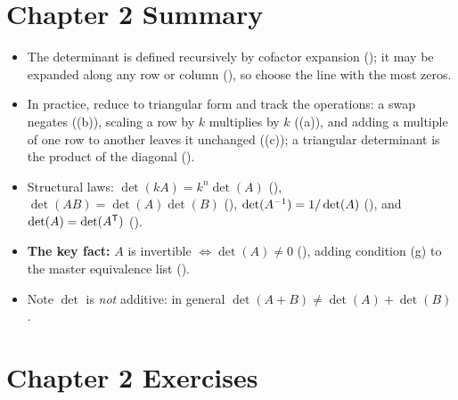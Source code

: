 \section*{Chapter 2 Summary}
\begin{itemize}[leftmargin=1.4em,itemsep=2pt]
\item The determinant is defined recursively by cofactor expansion (); it may be expanded along any row or column (), so choose the line with the most zeros.
\item In practice, reduce to triangular form and track the operations: a swap negates ((b)), scaling a row by $k$ multiplies by $k$ ((a)), and adding a multiple of one row to another leaves it unchanged ((c)); a triangular determinant is the product of the diagonal ().
\item Structural laws: $\det(kA)=k^n\det(A)$ (), $\det(AB)=\det(A)\det(B)$ (), $\det(A^{-1})=1/\det(A)$ (), and $\det(A)=\det(A^{\mathsf{T}})$ ().
\item \textbf{The key fact:} $A$ is invertible $\iff\det(A)\neq0$ (), adding condition (g) to the master equivalence list ().
\item Note $\det$ is \emph{not} additive: in general $\det(A+B)\neq\det(A)+\det(B)$.
\end{itemize}

\section*{Chapter 2 Exercises}

